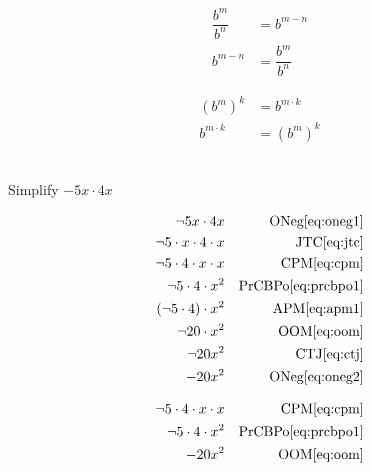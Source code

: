 \documentclass[20150903-160354-rs2.2-MarksMathNotebook.tex]{subfiles}
\begin{document}
\begin{arule}
\begin{subequations}
\begin{align}
	\dfrac{b^m}{b^n} &= b^{m-n} \label{eq:qcbpoo1}\\
	b^{m-n} &= \dfrac{b^m}{b^n} \label{eq:qcbpo2}
\end{align}
\end{subequations}
\end{arule}

\begin{arule}
\begin{subequations}
\begin{align}
	\left(b^m\right)^k &= b^{m \cdot k} \label{eq:popo1}\\
	b^{m \cdot k} &= \left( b^m \right)^k \label{eq:popo2}
\end{align}
\end{subequations}
\end{arule}

\begin{example}[id:20141108-191616] \label{20141108-191616}  \hfill \\

Simplify $-5x \cdot 4x$

\soln

\solnsteps
\begin{align*}
\neg 5x \cdot 4x && \text{ONeg} \eqref{eq:oneg1} \\
\neg 5 \cdot x \cdot 4 \cdot x && \text{JTC} \eqref{eq:jtc} \\
\neg 5 \cdot 4 \cdot x \cdot x && \text{CPM} \eqref{eq:cpm} \\
\neg 5 \cdot 4 \cdot x^2 && \text{PrCBPo} \eqref{eq:prcbpo1} \\
(\neg 5 \cdot 4) \cdot x^2 && \text{APM} \eqref{eq:apm1} \\
\neg 20 \cdot x^2 && \text{OOM} \eqref{eq:oom} \\
\neg 20 x^2 && \text{CTJ} \eqref{eq:ctj} \\
-20x^2 && \text{ONeg} \eqref{eq:oneg2}
\end{align*}

\soln

\lesssteps
\begin{align*}
\neg 5 \cdot 4 \cdot x \cdot x && \text{CPM} \eqref{eq:cpm} \\
\neg 5 \cdot 4 \cdot x^2 && \text{PrCBPo} \eqref{eq:prcbpo1} \\
-20x^2 && \text{OOM} \eqref{eq:oom}
\end{align*}

\end{example}
\end{document}
